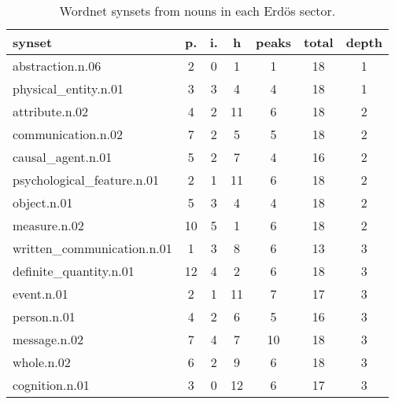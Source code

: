 \begin{table}[h!]
\begin{center}
\begin{tabular}{| l || c | c | c || c | c | c |}\hline
{\bf synset} & {\bf p.} & {\bf i.} & {\bf h} & {\bf peaks} & {\bf total} & {\bf depth} \\\hline\hline
abstraction.n.06 & 2  & 0  & 1  & 1  & 18  & 1 \\
physical\_entity.n.01 & 3  & 3  & 4  & 4  & 18  & 1 \\\hline
attribute.n.02 & 4  & 2  & 11  & 6  & 18  & 2 \\
communication.n.02 & 7  & 2  & 5  & 5  & 18  & 2 \\
causal\_agent.n.01 & 5  & 2  & 7  & 4  & 16  & 2 \\
psychological\_feature.n.01 & 2  & 1  & 11  & 6  & 18  & 2 \\
object.n.01 & 5  & 3  & 4  & 4  & 18  & 2 \\
measure.n.02 & 10  & 5  & 1  & 6  & 18  & 2 \\\hline
written\_communication.n.01 & 1  & 3  & 8  & 6  & 13  & 3 \\
definite\_quantity.n.01 & 12  & 4  & 2  & 6  & 18  & 3 \\
event.n.01 & 2  & 1  & 11  & 7  & 17  & 3 \\
person.n.01 & 4  & 2  & 6  & 5  & 16  & 3 \\
message.n.02 & 7  & 4  & 7  & 10  & 18  & 3 \\
whole.n.02 & 6  & 2  & 9  & 6  & 18  & 3 \\
cognition.n.01 & 3  & 0  & 12  & 6  & 17  & 3 \\\hline
\end{tabular}
\caption{Wordnet synsets from nouns in each Erd\"os sector.}
\end{center}
\end{table}